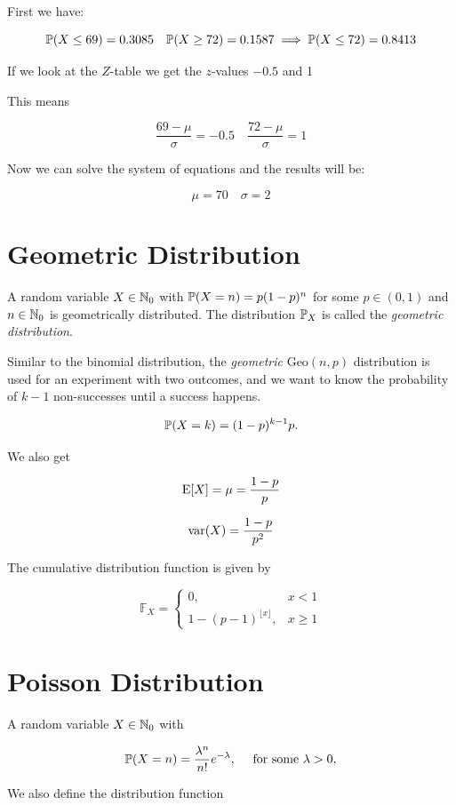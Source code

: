 First we have: 

\[
    \mathbb{P}(X \le 69) = 0.3085 \quad \mathbb{P}(X \ge 72) = 0.1587 \implies  \mathbb{P}(X \le  72) = 0.8413
\]

If we look at the \(Z\)-table we get the \(z\)-values \(-0.5\) and 1

This means 

\[
    \frac{69 - \mu}{ \sigma} = -0.5 \quad \frac{72 - \mu}{ \sigma} = 1
\]

Now we can solve the system of equations and the results will be:

\[
    \mu = 70  \quad \sigma = 2
\]

\section{Geometric Distribution}

A random variable \(X \in \mathbb{N}_0\) with \(\mathbb{P}(X = n) = p(1 - p)^n\) for some \(p \in (0, 1)\) and \(n \in \mathbb{N}_0\) 
is geometrically distributed. The distribution \(\mathbb{P}_X\) is called the \emph{geometric distribution}.

Similar to the binomial distribution, the \emph{geometric} \(\mathrm{Geo}(n, p)\) distribution is used for an experiment with two 
outcomes, and we want to know the probability of \(k - 1\) non-successes until a success happens.  

\[
    \mathbb{P}(X = k) = (1 - p)^{k - 1}p.
\]

We also get

\[
    \mathrm{E}[X] = \mu = \frac{1 - p}{p}
\]

\[
    \mathrm{var}(X) = \frac{1 - p}{p^2}
\]

The cumulative distribution function is given by 

\[
    \mathbb{F}_X = 
    \begin{cases}
        0, & x < 1 \\ 
        1 - (p - 1)^{\lfloor x \rfloor}, & x \ge 1
    \end{cases}
\]

\section{Poisson Distribution}

A random variable \(X \in \mathbb{N}_0\) with 

\[
    \mathbb{P}(X = n) = \frac{\lambda^n}{n!} e^{-\lambda}, \quad \text{ for some } \lambda > 0,
\] 

We also define the distribution function 

